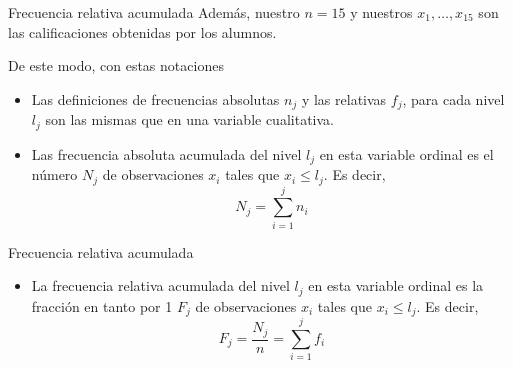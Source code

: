 \documentclass[
  ignorenonframetext,
]{beamer}
\providecommand{\tightlist}{%
  \setlength{\itemsep}{0pt}\setlength{\parskip}{0pt}}
\begin{document}
\begin{frame}{Frecuencia relativa acumulada}
\label{frecuencia-relativa-acumulada-1}
Además, nuestro \(n = 15\) y nuestros \(x_1,\dots,x_{15}\) son las
calificaciones obtenidas por los alumnos.

De este modo, con estas notaciones

\begin{itemize}
\tightlist
\item
  Las definiciones de frecuencias absolutas \(n_j\) y las relativas
  \(f_j\), para cada nivel \(l_j\) son las mismas que en una variable
  cualitativa.
\item
  Las frecuencia absoluta acumulada del nivel \(l_j\) en esta variable
  ordinal es el número \(N_j\) de observaciones \(x_i\) tales que
  \(x_i\le l_j\). Es decir, \[N_j=\sum_{i=1}^jn_i\]
\end{itemize}
\end{frame}

\begin{frame}{Frecuencia relativa acumulada}
\label{frecuencia-relativa-acumulada-2}
\begin{itemize}
\tightlist
\item
  La frecuencia relativa acumulada del nivel \(l_j\) en esta variable
  ordinal es la fracción en tanto por 1 \(F_j\) de observaciones \(x_i\)
  tales que \(x_i\le l_j\). Es decir,
  \[F_j=\frac{N_j}{n}=\sum_{i=1}^jf_i\]
\end{itemize}
\end{frame}
\end{document}
